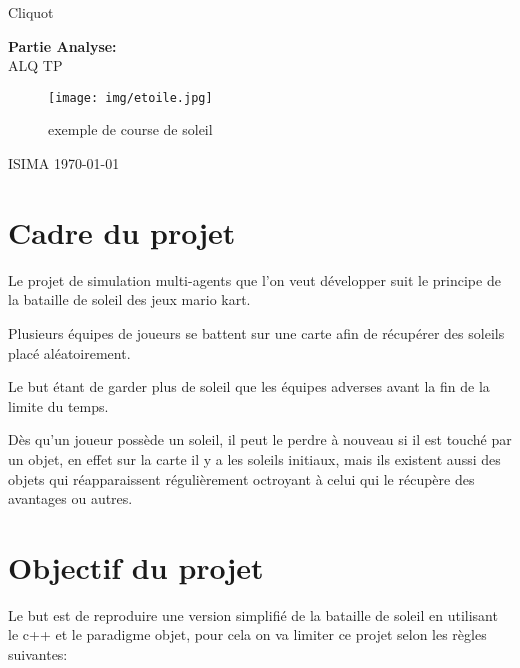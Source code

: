 \documentclass[11pt]{article}
\begin{document}
\begin{titlepage}
  Cliquot
  \begin{center}
       \vspace*{1cm}

  \color{red}
  {\huge \bfseries Partie Analyse: \\[0.8cm]}
  \color{black}
  \vspace{0.5cm}
  {\huge   ALQ TP}
      
       \vspace{8cm}
       
       \begin{figure}[h]
         \centering
         \texttt{[image: img/etoile.jpg]}
         \caption{exemple de course de soleil}
       \end{figure}

      
       \vfill
            
       ISIMA \hfill \today
            
     \end{center}
     
   \end{titlepage}
   

\newpage
\begin{center}
  \vspace{10cm}
  \tableofcontents
  \vspace{2cm}
\lstlistoflistings%
\listoftables
\listoffigures
\end{center}
\newpage

\section{Cadre du projet}
\label{sec:orga47d616}

Le projet de simulation multi-agents que l'on veut développer suit le principe de la bataille de soleil des jeux mario kart.

Plusieurs équipes de joueurs se battent sur une carte afin de récupérer des soleils placé aléatoirement.

Le but étant de garder plus de soleil que les équipes adverses avant la fin de la limite du temps.

Dès qu'un joueur possède un soleil, il peut le perdre à nouveau si il est touché par un objet, en effet sur la carte il y a les soleils initiaux, mais ils existent aussi des objets qui réapparaissent régulièrement octroyant à celui qui le récupère des avantages ou autres.

\section{Objectif du projet}
\label{sec:org83e8dd6}
Le but est de reproduire une version simplifié de la bataille de soleil en utilisant le c++ et le paradigme objet, pour cela on va limiter ce projet selon les
règles suivantes:
\end{document}

